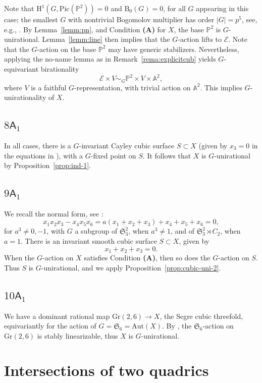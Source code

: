 \documentclass[12pt,reqno]{amsart}
\theoremstyle{plain}
\theoremstyle{remark}
\theoremstyle{definition}
\numberwithin{equation}{section}
\def\sA{{\mathsf A}}
\def\fS{{\mathfrak S}}
\def\fS{{\mathfrak S}}
\def\bA{{\mathbb A}}
\def\bP{{\mathbb P}}
\def\rH{{\mathrm H}}
\def\Pic{\mathrm{Pic}}
\def\Aut{\mathrm{Aut}}
\begin{document}
Note that $\rH^1(G,\Pic(\mathbb{P}^2))=0$ and $\mathrm{B}_0(G)=0$, for all $G$ appearing in this case; the smallest $G$ with nontrivial Bogomolov multiplier has order $|G|=p^5$, see, e.g., \cite{Mora}. By Lemma~\ref{lemm:pn}, and Condition {\bf (A)} for $X$, the base $\mathbb{P}^2$ is $G$-unirational. 
Lemma~\ref{lemm:line} then implies that the $G$-action lifts to $\mathcal E$. 
Note that the $G$-action on the base $\bP^2$ may have generic stabilizers. Nevertheless, applying the no-name lemma as in Remark~\ref{rema:explicitcub} yields $G$-equivariant birationality 
$$
\mathcal E\times V  \sim_G \mathbb{P}^2\times V\times \bA^2, 
$$
where $V$ is a faithful $G$-representation, with trivial action on $\bA^2$. This implies $G$-unirationality of $X$. 

\subsection*{$8\sA_1$}
In all  cases, there is a $G$-invariant Cayley cubic surface $S\subset X$ (given by $x_3=0$ in the equations in \cite[Proposition 8.2]{CTZ-cubic}), with a $G$-fixed point on $S$. It follows that $X$ is $G$-unirational  by Proposition~\ref{prop:ind-1}.


\subsection*{$9\mathsf A_1$} 
We recall the normal form, see \cite[Section 9]{CTZ-cubic}:
$$
x_1x_2x_3-x_4x_5x_6=a(x_1+x_2+x_3)+x_4+x_5+x_6=0,
$$
for $a^3\ne 0,-1$,
with $G$ a subgroup of $\fS_3^2$, when $a^3\neq 1$, and of 
$\fS_3^2\rtimes C_2$, when $a=1$. 
There is an invariant smooth cubic surface $S\subset X$, given by
$$
x_1+x_2+x_3=0.
$$
When the $G$-action on $X$ satisfies Condition {\bf (A)}, then so does the $G$-action on $S$. Thus $S$ is $G$-unirational, and we apply Proposition~\ref{prop:cubic-uni-2}.

\subsection*{$10\mathsf A_1$} We have a dominant rational map $\mathrm{Gr}(2,6)\to X$, the Segre cubic threefold, equivariantly for the action of $G=\fS_6=\Aut(X)$. By \cite[Proposition 19]{HT-torsor}, the $\fS_6$-action on 
    $\mathrm{Gr}(2,6)$ is stably linearizable, thus $X$ is $G$-unirational. 





\section{Intersections of two quadrics}
\label{sect:2quad}
\end{document}
